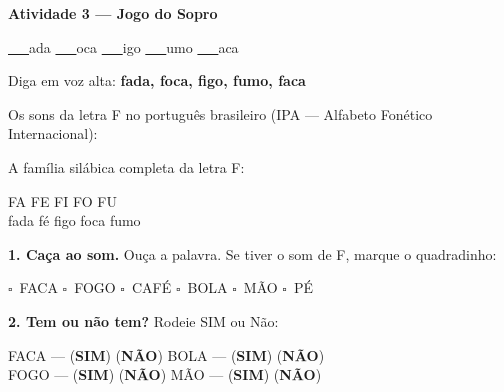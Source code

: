 \begin{consolidacao}
\textbf{Atividade 3 --- Jogo do Sopro}


\begin{center}
\underline{~~~}ada \quad \underline{~~~}oca \quad \underline{~~~}igo \quad \underline{~~~}umo \quad \underline{~~~}aca
\end{center}
Diga em voz alta: \textbf{fada, foca, figo, fumo, faca}

\end{consolidacao}


\begin{sonsdaletra}
Os sons da letra F no portugu\^es{} brasileiro (IPA --- Alfabeto Fon\'etico Internacional):

\end{sonsdaletra}


\begin{familiasilabica}
A fam\'ilia sil\'abica completa da letra F:

\begin{center}
FA \quad FE \quad FI \quad FO \quad FU \\[0.5em] fada \quad f\'e \quad figo \quad foca \quad fumo
\end{center}
\end{familiasilabica}


\begin{somletra}
\textbf{1. Ca\c{c}a ao som.} Ou\c{c}a a palavra. Se tiver o som de F, marque o quadradinho:
\begin{center}
$\square$~FACA \quad $\square$~FOGO \quad $\square$~CAF\'E \quad $\square$~BOLA \quad $\square$~M\~AO \quad $\square$~P\'E
\end{center}

\textbf{2. Tem ou n\~ao{} tem?} Rodeie SIM ou N\~ao:
\begin{center}
FACA --- (\textbf{SIM}) (\textbf{N\~AO}) \quad BOLA --- (\textbf{SIM}) (\textbf{N\~AO}) \\ FOGO --- (\textbf{SIM}) (\textbf{N\~AO}) \quad M\~AO --- (\textbf{SIM}) (\textbf{N\~AO})
\end{center}
\end{somletra}

